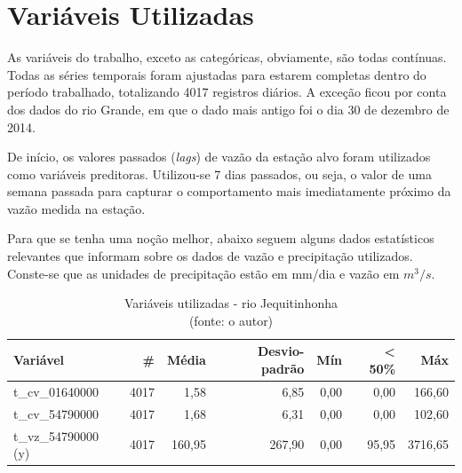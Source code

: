 \section{Variáveis Utilizadas}

As variáveis do trabalho, exceto as categóricas, obviamente, são todas contínuas. Todas as séries temporais foram ajustadas para estarem completas dentro do período trabalhado, totalizando 4017 registros diários. A exceção ficou por conta dos dados do rio Grande, em que o dado mais antigo foi o dia 30 de dezembro de 2014.

De início, os valores passados (\textit{lags}) de vazão da estação alvo foram utilizados como variáveis preditoras. Utilizou-se 7 dias passados, ou seja, o valor de uma semana passada para capturar o comportamento mais imediatamente próximo da vazão medida na estação.

Para que se tenha uma noção melhor, abaixo seguem alguns dados estatísticos relevantes que informam sobre os dados de vazão e precipitação utilizados. Conste-se que as unidades de precipitação estão em mm/dia e vazão em $m^3/s$.

\begin{table}[!h]
	\centering \small
	\caption{Variáveis utilizadas - rio Jequitinhonha \\(fonte: o autor)}
	\begin{tabular}{|l|r|r|r|r|r|r|} \hline 
		\textbf{Variável}   & \textbf{\#} & \textbf{Média} & \textbf{Desvio-padrão} & \textbf{Mín} & \textbf{< 50\%} & \textbf{Máx} \\\hline
		t\_cv\_01640000     & 4017        & 1,58           & 6,85                   & 0,00         & 0,00            & 166,60       \\\hline
		t\_cv\_54790000     & 4017        & 1,68           & 6,31                   & 0,00         & 0,00            & 102,60       \\\hline
		t\_vz\_54790000 (y) & 4017        & 160,95         & 267,90                 & 0,00         & 95,95           & 3716,65      \\\hline
	\end{tabular}
	\label{tab:variaveis_jequitinhonha}
\end{table}

